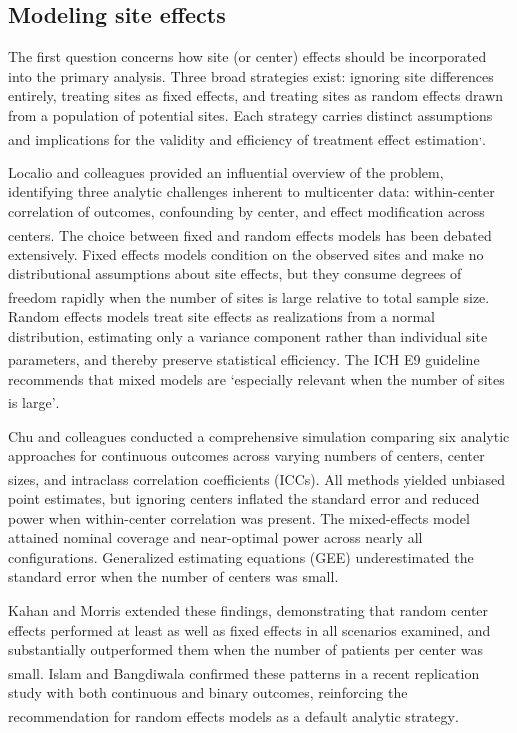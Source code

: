 \documentclass[
  11pt,
]{article}
\begin{document}
\subsection{Modeling site effects}\label{modeling-site-effects}

The first question concerns how site (or center) effects
should be incorporated into the primary analysis. Three
broad strategies exist: ignoring site differences entirely,
treating sites as fixed effects, and treating sites as
random effects drawn from a population of potential sites.
Each strategy carries distinct assumptions and implications
for the validity and efficiency of treatment effect
estimation\textsuperscript{,}.

Localio and colleagues provided an influential overview of
the problem, identifying three analytic challenges inherent
to multicenter data: within-center correlation of outcomes,
confounding by center, and effect modification across
centers\textsuperscript{}. The choice between fixed
and random effects models
has been debated extensively. Fixed effects models condition
on the observed sites and make no distributional assumptions
about site effects, but they consume degrees of freedom
rapidly when the number of sites is large relative to total
sample size\textsuperscript{}. Random effects models
treat site effects as realizations from a normal distribution,
estimating only a variance component rather than individual
site parameters, and thereby preserve statistical efficiency\textsuperscript{}. The ICH E9 guideline recommends that mixed
models are `especially relevant when the number of sites is
large'\textsuperscript{}.

Chu and colleagues conducted a comprehensive simulation
comparing six analytic approaches for continuous outcomes
across varying numbers of centers, center sizes, and
intraclass correlation coefficients (ICCs)\textsuperscript{}. All methods
yielded unbiased point estimates, but ignoring centers
inflated the standard error and reduced power when
within-center correlation was present. The mixed-effects
model attained nominal coverage and near-optimal power
across nearly all configurations. Generalized estimating
equations (GEE) underestimated the standard error when the
number of centers was small.

Kahan and Morris extended these findings, demonstrating that
random center effects performed at least as well as fixed
effects in all scenarios examined, and substantially
outperformed them when the number of patients per center was
small\textsuperscript{}. Islam and Bangdiwala
confirmed these patterns in a recent replication study with
both continuous and binary outcomes, reinforcing the
recommendation for random effects models as a default
analytic strategy\textsuperscript{}.
\end{document}
